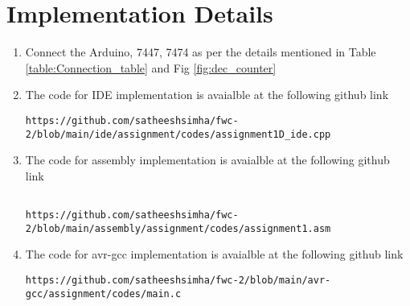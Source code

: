 \documentclass[journal,12pt,twocolumn]{IEEEtran}
\begin{document}
\section{\textbf{Implementation Details}}
\begin{enumerate}[1.]

\item Connect the Arduino, 7447, 7474 as per the details mentioned in Table \ref{table:Connection_table} and Fig \ref{fig:dec_counter}

\item The code for IDE implementation is avaialble at the following github link

\begin{lstlisting}
https://github.com/satheeshsimha/fwc-2/blob/main/ide/assignment/codes/assignment1D_ide.cpp
\end{lstlisting}

\item The code for  assembly implementation is avaialble at the following github link
\begin{lstlisting}

https://github.com/satheeshsimha/fwc-2/blob/main/assembly/assignment/codes/assignment1.asm
\end{lstlisting}

\item The code for  avr-gcc implementation is avaialble at the following github link
\begin{lstlisting}
https://github.com/satheeshsimha/fwc-2/blob/main/avr-gcc/assignment/codes/main.c
\end{lstlisting}

\vspace{2cm}


\end{enumerate}
\end{document}
